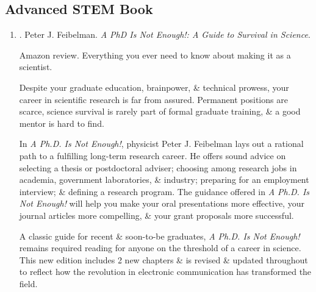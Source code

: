 \documentclass{article}
\begin{document}

\subsection{Advanced STEM Book}

\begin{enumerate}
	\item \cite{Feibelman2011}. {\sc Peter J. Feibelman}. {\it A PhD Is Not Enough!: A Guide to Survival in Science}. {}

	{\sf Amazon review.} Everything you ever need to know about making it as a scientist.

	Despite your graduate education, brainpower, \& technical prowess, your career in scientific research is far from assured. Permanent positions are scarce, science survival is rarely part of formal graduate training, \& a good mentor is hard to find.

	In {\it A Ph.D. Is Not Enough!}, physicist {\sc Peter J. Feibelman} lays out a rational path to a fulfilling long-term research career. He offers sound advice on selecting a thesis or postdoctoral adviser; choosing among research jobs in academia, government laboratories, \& industry; preparing for an employment interview; \& defining a research program. The guidance offered in {\it A Ph.D. Is Not Enough!} will help you make your oral presentations more effective, your journal articles more compelling, \& your grant proposals more successful.

	A classic guide for recent \& soon-to-be graduates, {\it A Ph.D. Is Not Enough!} remains required reading for anyone on the threshold of a career in science. This new edition includes 2 new chapters \& is revised \& updated throughout to reflect how the revolution in electronic communication has transformed the field.


\end{enumerate}
\end{document}
